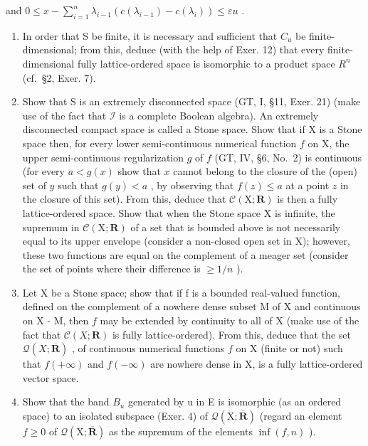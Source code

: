 and \(0 \leqslant x - \sum_{i=1}^{n} \lambda_{i-1} (c(\lambda_{i-1}) - c(\lambda_i)) \leqslant \varepsilon u\) .

\begin{enumerate}
\def\labelenumi{\alph{enumi})}
\setcounter{enumi}{4}
\item
  In order that S be finite, it is necessary and sufficient that \(C_{u}\) be finite-dimensional; from this, deduce (with the help of Exer. 12) that every finite-dimensional fully lattice-ordered space is isomorphic to a product space \(R^{n}\) (cf.~§2, Exer. 7).
\item
  Show that S is an extremely disconnected space (GT, I, §11, Exer. 21) (make use of the fact that \(\mathcal{I}\) is a complete Boolean algebra). An extremely disconnected compact space is called a Stone space. Show that if X is a Stone space then, for every lower semi-continuous numerical function \(f\) on X, the upper semi-continuous regularization \(g\) of \(f\) (GT, IV, §6, No.~2) is continuous (for every \(a < g(x)\) show that \(x\) cannot belong to the closure of the (open) set of \(y\) such that \(g(y) < a\) , by observing that \(f(z) \leqslant a\) at a point \(z\) in the closure of this set). From this, deduce that \(\mathcal{C}(\mathrm{X};\mathbf{R})\) is then a fully lattice-ordered space. Show that when the Stone space X is infinite, the supremum in \(\mathcal{C}(\mathrm{X};\mathbf{R})\) of a set that is bounded above is not necessarily equal to its upper envelope (consider a non-closed open set in X); however, these two functions are equal on the complement of a meager set (consider the set of points where their difference is \(\geqslant 1/n\) ).
\item
  Let X be a Stone space; show that if f is a bounded real-valued function, defined on the complement of a nowhere dense subset M of X and continuous on X - M, then \(f\) may be extended by continuity to all of X (make use of the fact that \(\mathcal{C}(X; \mathbf{R})\) is fully lattice-ordered). From this, deduce that the set \(\mathcal{Q}(X; \overline{\mathbf{R}})\) , of continuous numerical functions \(f\) on X (finite or not) such that \(f(+\infty)\) and \(f(-\infty)\) are nowhere dense in X, is a fully lattice-ordered vector space.
\item
  Show that the band \(B_{u}\) generated by u in E is isomorphic (as an ordered space) to an isolated subspace (Exer. 4) of \(\mathcal{Q}(\mathrm{X};\overline{\mathbf{R}})\) (regard an element \(f \geqslant 0\) of \(\mathcal{Q}(\mathrm{X};\overline{\mathbf{R}})\) as the supremum of the elements \(\inf(f,n)\) ).
\end{enumerate}

